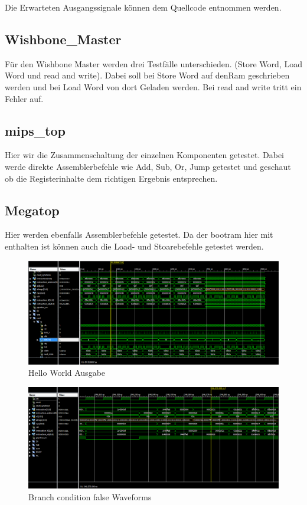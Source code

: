 \documentclass[11pt]{article} %
\begin{document}
Die Erwarteten Ausgangssignale können dem Quellcode entnommen werden.
\subsection{Wishbone\_Master}
Für den Wishbone Master werden drei Testfälle unterschieden. (Store Word, Load Word und read and write).
Dabei soll bei Store Word auf denRam geschrieben werden und bei Load Word von dort Geladen werden. Bei read and write tritt ein Fehler auf.
\subsection{mips\_top}
Hier wir die Zusammenschaltung der einzelnen Komponenten getestet.
Dabei werde direkte Assemblerbefehle wie Add, Sub, Or, Jump getestet und geschaut ob die Registerinhalte dem richtigen Ergebnis entsprechen.
\subsection{Megatop}
Hier werden ebenfalls Assemblerbefehle getestet. Da der bootram hier mit enthalten ist können auch die Load- und Stoarebefehle getestet werden.

\begin{figure}[h!]
\centering
\includegraphics[width=1\textwidth]{Hello World Waveforms.png}
\caption{Hello World Ausgabe}
\end{figure}

\begin{figure}[h!]
\centering
\includegraphics[width=1\textwidth]{Branch condition false Waveforms.png}
\caption{Branch condition false Waveforms}
\end{figure}
\end{document}
